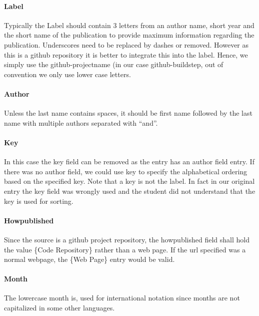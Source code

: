 \paragraph{Label}
\label{\detokenize{lesson/doc/bibtex:label}}
Typically the Label should contain 3 letters from an author name,
short year and the short name of the publication to provide maximum
information regarding the publication. Underscores need to be replaced
by dashes or removed. However as this is a github repository it is
better to integrate this into the label. Hence, we simply use the
github-projectname (in our case github-buildstep, out of convention we
only use lower case letters.


\paragraph{Author}
\label{\detokenize{lesson/doc/bibtex:author}}
Unless the last name contains spaces, it should be first name followed
by the last name with multiple authors separated with ``and''.


\paragraph{Key}
\label{\detokenize{lesson/doc/bibtex:key}}
In this case the key field can be removed as the entry has an author
field entry. If there was no author field, we could use key to specify
the alphabetical ordering based on the specified key. Note that a key
is not the label. In fact in our original entry the key field was
wrongly used and the student did not understand that the key is used
for sorting.


\paragraph{Howpublished}
\label{\detokenize{lesson/doc/bibtex:howpublished}}
Since the source is a github project repository, the howpublished
field shall hold the value \{Code Repository\} rather than a web
page. If the url specified was a normal webpage, the \{Web Page\} entry
would be valid.


\paragraph{Month}
\label{\detokenize{lesson/doc/bibtex:month}}
The lowercase month is, used for international notation since months
are not capitalized in some other languages.


